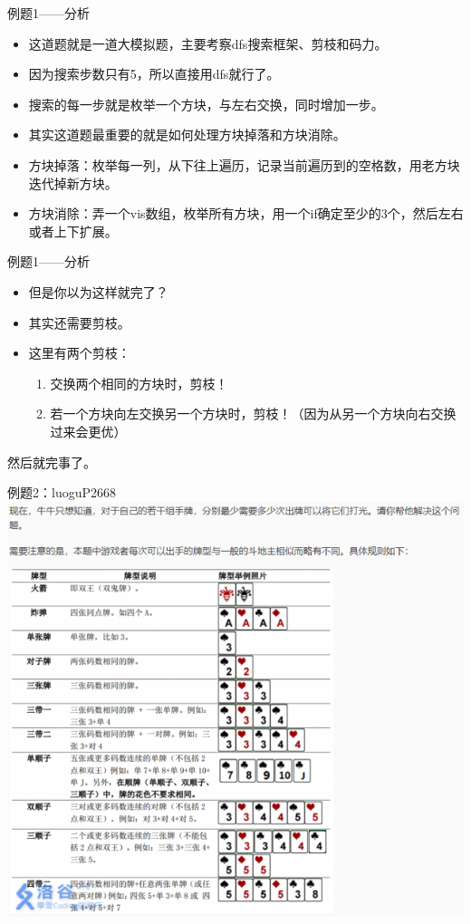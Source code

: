\documentclass{beamer}[UTF-8]
\begin{document}
\begin{frame}{例题1——分析}
  \pause
\begin{itemize}
\item 这道题就是一道大模拟题，主要考察dfs搜索框架、剪枝和码力。 \pause
\item 因为搜索步数只有5，所以直接用dfs就行了。 \pause
\item 搜索的每一步就是枚举一个方块，与左右交换，同时增加一步。 \pause
\item 其实这道题最重要的就是如何处理方块掉落和方块消除。 \pause
\item 方块掉落：枚举每一列，从下往上遍历，记录当前遍历到的空格数，用老方块迭代掉新方块。 \pause
\item 方块消除：弄一个vis数组，枚举所有方块，用一个if确定至少的3个，然后左右或者上下扩展。
\end{itemize}
\end{frame}

\begin{frame}{例题1——分析}
  \pause
\begin{itemize}
\item 但是你以为这样就完了？ \pause
\item 其实还需要剪枝。 \pause
\item 这里有两个剪枝： \pause
\begin{enumerate}
  \item 交换两个相同的方块时，剪枝！ \pause
  \item 若一个方块向左交换另一个方块时，剪枝！（因为从另一个方块向右交换过来会更优） \pause
\end{enumerate}
\end{itemize}
然后就完事了。
\end{frame}

\begin{frame}{例题2：luoguP2668}
\includegraphics[width=\textwidth, height=\textheight]{luoguP2668.png}
\end{frame}
\end{document}
